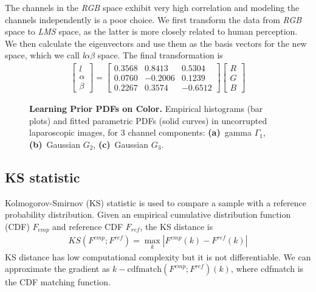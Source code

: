The channels in the \textit{RGB} space exhibit very high correlation and modeling the channels independently is a poor choice. We first transform the data from \textit{RGB} space to \textit{LMS} space, as the latter is more closely related to human perception. We then calculate the eigenvectors and use them as the basis vectors for the new space, which we call \textit{l$\alpha\beta$} space. The final transformation is 
\begin{align}
    \begin{bmatrix}
    l \\ \alpha \\ \beta
    \end{bmatrix}
    = 
    \begin{bmatrix}
    0.3568 & 0.8413 & 0.5304 \\
    0.0760 & -0.2006 & 0.1239 \\
    0.2267 & 0.3574 & -0.6512  
    \end{bmatrix}
    \begin{bmatrix}
    R \\ G \\ B
    \end{bmatrix}
\end{align}

\begin{figure}[!t]
    \caption
    {
        {\bf Learning Prior PDFs on Color.}
        Empirical histograms (bar plots) and fitted parametric PDFs (solid curves) in uncorrupted laparoscopic images, for 3 channel components: {\bf
            (a)}~gamma $\Gamma_1$, {\bf (b)}~Gaussian $G_2$, {\bf (c)}~Gaussian $G_3$.
    }
    \label{fig:intensity_dist}
\end{figure}


\subsection{KS statistic}
Kolmogorov-Smirnov (KS) statistic is used to compare a sample with a reference probability distribution. Given an empirical cumulative distribution function (CDF) $F_{emp}$ and reference CDF $F_{ref}$, the KS distance is
\begin{align}
    KS(F^{emp}; F^{ref}) = \max_{k} | F^{emp}(k) - F^{ref}(k) | \label{eqn:ks_distance}
\end{align}
KS distance has low computational complexity but it is not differentiable. We can approximate the gradient as $k - \text{cdfmatch}(F^{emp}; F^{ref})(k)$, where cdfmatch is the CDF matching function.

